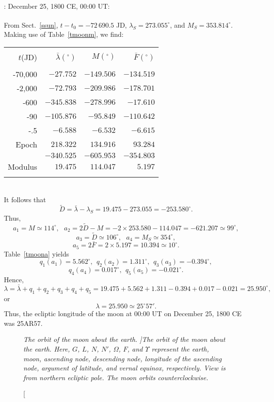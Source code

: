 ~\\
: December 25, 1800 CE, 00:00 UT:\\
~\\
From Sect.~\ref{ssun}, $t-t_0=-72\,690.5$ JD, $\lambda_S = 273.055^\circ$, and $M_S= 353.814^\circ$. 
Making use of Table~\ref{tmoonm}, we find:\\
\begin{tabular}{rrrr}
&&&\\
$t$(JD) & $ \bar{\lambda}(^\circ)$ & $M(^\circ)$ & $\bar{F}(^\circ)$\\[-2ex]
&&&\\
-70,000 & $-27.752$ & $-149.506$ & $-134.519$\\
-2,000 & $-72.793$ & $-209.986$ & $-178.701$\\
-600 & $-345.838$ & $-278.996$ & $-17.610$\\
-90 & $-105.876$ & $-95.849$ & $-110.642$\\
-.5 & $-6.588$ & $-6.532$ & $-6.615$\\
Epoch & $218.322$ & $134.916$ & $93.284$\\\cline{2-4}
&$-340.525$ & $-605.953$ & $-354.803$\\\cline{2-4}
Modulus & $19.475$ & $114.047$ &$5.197$\\ 
&&&\\
\end{tabular}\\
It follows that $$
\tilde{D}=\bar{\lambda}-\lambda_S = 19.475-273.055 = -253.580^\circ.
$$
Thus, 
$$
a_1=M\simeq 114^\circ,~~~a_2=2\tilde{D}-M = -2\times 253.580-114.047=-621.207 \simeq 99^\circ,
$$ 
$$
a_3=\tilde{D}\simeq 106^\circ,~~~a_4 = M_S\simeq 354^\circ,
$$ 
$$
a_5=2\bar{F} = 2\times 5.197=10.394\simeq 10^\circ.
$$
Table~\ref{tmoona} yields $$
q_1(a_1)=5.562^\circ,~~q_2(a_2)= 1.311^\circ,~~q_3(a_3) = -0.394^\circ,
$$
$$q_4(a_4)=0.017^\circ,~~q_5(a_5)= -0.021^\circ.
$$
 Hence,
$$
\lambda = \bar{\lambda} + q_1+q_2+q_3+q_4+q_5=19.475+5.562+1.311-0.394+0.017-0.021=
25.950^\circ,
$$
or 
$$
\lambda =25.950\simeq 25^\circ 57'.
$$
Thus, the ecliptic longitude of the moon at 00:00 UT on December 25, 1800 CE was 25AR57.

\begin{figure}[h]
\epsfysize=3in
\centerline{}
\caption[\em The orbit of the moon about the earth. ]{\em The orbit of the moon about the earth.  Here, $G$, $L$, $N$, $N'$,   $\Omega$, $F$, and $\Upsilon$
represent the earth, moon, ascending node, descending node, longitude of the ascending node, argument of latitude, and vernal equinox, respectively. View is from northern ecliptic pole. The moon orbits counterclockwise.}\label{fmoon}
\end{figure}


